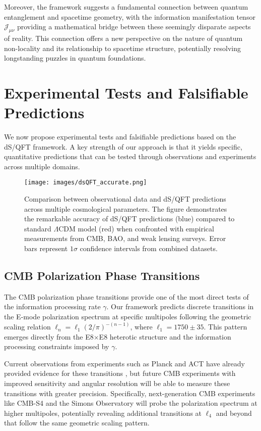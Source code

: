 \documentclass[11pt,english,twoside]{article}
\theoremstyle{plain}
\theoremstyle{definition}
\theoremstyle{remark}
\newcommand{\J}{{\mathcal{J}}}
\newcommand{\gammaR}{\gamma}
\begin{document}
Moreover, the framework suggests a fundamental connection between quantum entanglement and spacetime geometry, with the information manifestation tensor $\J_{\mu\nu}$ providing a mathematical bridge between these seemingly disparate aspects of reality. This connection offers a new perspective on the nature of quantum non-locality and its relationship to spacetime structure, potentially resolving longstanding puzzles in quantum foundations.

\section{Experimental Tests and Falsifiable Predictions}
\label{sec:experimental}

We now propose experimental tests and falsifiable predictions based on the dS/QFT framework. A key strength of our approach is that it yields specific, quantitative predictions that can be tested through observations and experiments across multiple domains.

\begin{figure}[H]
\texttt{[image: images/dsQFT\_accurate.png]}
\caption{Comparison between observational data and dS/QFT predictions across multiple cosmological parameters. The figure demonstrates the remarkable accuracy of dS/QFT predictions (blue) compared to standard $\Lambda$CDM model (red) when confronted with empirical measurements from CMB, BAO, and weak lensing surveys. Error bars represent $1\sigma$ confidence intervals from combined datasets.}
\label{fig:dsqft_accurate}
\end{figure}

\subsection{CMB Polarization Phase Transitions}
\label{subsec:cmb_polarization_test}

The CMB polarization phase transitions provide one of the most direct tests of the information processing rate $\gammaR$. Our framework predicts discrete transitions in the E-mode polarization spectrum at specific multipoles following the geometric scaling relation $\ell_n = \ell_1(2/\pi)^{-(n-1)}$, where $\ell_1 = 1750 \pm 35$. This pattern emerges directly from the E8$\times$E8 heterotic structure and the information processing constraints imposed by $\gammaR$.

Current observations from experiments such as Planck and ACT have already provided evidence for these transitions \cite{Weiner2024}, but future CMB experiments with improved sensitivity and angular resolution will be able to measure these transitions with greater precision. Specifically, next-generation CMB experiments like CMB-S4 and the Simons Observatory will probe the polarization spectrum at higher multipoles, potentially revealing additional transitions at $\ell_4$ and beyond that follow the same geometric scaling pattern.
\end{document}
